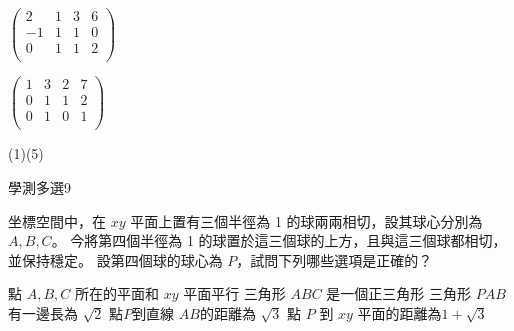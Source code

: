 \begin{QUESTIONS}
\begin{QUESTION}
\begin{QBODY}
\begin{QOPS}
				\QOP $\left( \begin{array}{cccc} 2 & 1 & 3 & 6 \\-1 & 1 & 1 & 0 \\0 & 1 & 1 & 2 \\\end{array}\right)$

				\QOP $\left( \begin{array}{cccc} 1 & 3 & 2 & 7 \\0 & 1 & 1 & 2 \\0 & 1 & 0 & 1 \\\end{array}\right)$
			\end{QOPS}
        \end{QBODY}
        \begin{QFROMS}
        \end{QFROMS}
        \begin{QTAGS}\end{QTAGS}
        \begin{QANS}
            (1)(5)
        \end{QANS}
        \begin{QSOLLIST}
        \end{QSOLLIST}
        \begin{QEMPTYSPACE}
        \end{QEMPTYSPACE}
    \end{QUESTION}
    \begin{QUESTION}
        \begin{ExamInfo}{96}{學測}{多選}{9}
        \end{ExamInfo}
        \begin{ExamAnsRateInfo}{42}{70}{39}{17}
        \end{ExamAnsRateInfo}
        \begin{QBODY}
            坐標空間中，在 $xy$ 平面上置有三個半徑為 1 的球兩兩相切，設其球心分別為 $A,B,C$。
			今將第四個半徑為 1 的球置於這三個球的上方，且與這三個球都相切，並保持穩定。
			設第四個球的球心為 $P$，試問下列哪些選項是正確的？
			\begin{QOPS}
			 \QOP 點 $A,B,C$ 所在的平面和 $xy$  平面平行
			 \QOP 三角形 $ABC$ 是一個正三角形 
			 \QOP 三角形 $PAB$ 有一邊長為 $\sqrt{2}$ 
			 \QOP 點$P$到直線 $AB$的距離為 $\sqrt{3}$ 
			 \QOP 點 $P$ 到 $xy$ 平面的距離為$1+ \sqrt{3}$
			\end{QOPS}
        \end{QBODY}
        \begin{QFROMS}

\end{QFROMS}
\end{QUESTION}
\end{QUESTIONS}
